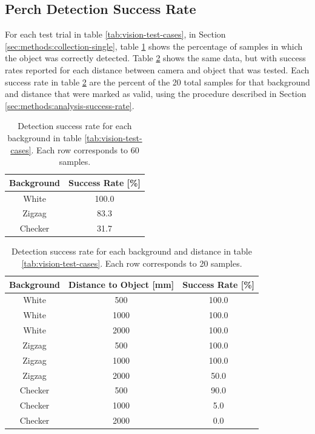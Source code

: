 \subsection{Perch Detection Success Rate} \label{sec:results:perch-rate}

For each test trial in table \ref{tab:vision-test-cases}, in Section \ref{sec:methods:collection-single}, table \ref{tab:success-rates} shows
the percentage of samples in which the object was correctly detected. Table \ref{tab:success-rates-dist}
shows the same data, but with success rates reported for each distance between camera and object that 
was tested. Each success rate in table \ref{tab:success-rates-dist} are the percent of the 20 total
samples for that background and distance that were marked as valid, using the procedure described in 
Section \ref{sec:methods:analysis-success-rate}.

\begin{table}[H]
    \centering
    \caption{Detection success rate for each background in table \ref{tab:vision-test-cases}. Each row corresponds to 60 samples.}
    \label{tab:success-rates}
    \begin{tabular}{|c||c|}
        \hline
        Background & Success Rate [\%] \\
        \hline
        White & 100.0  \\
        Zigzag & 83.3 \\
        Checker & 31.7 \\
        \hline
    \end{tabular}
\end{table}

\begin{table}[H]
    \centering
    \caption{Detection success rate for each background and distance in table \ref{tab:vision-test-cases}. Each row corresponds to 20 samples.}
    \label{tab:success-rates-dist}
    \begin{tabular}{|c|c||c|}
        \hline
        Background & Distance to Object [mm] & Success Rate [\%] \\
        \hline
        White & 500 & 100.0 \\
        White & 1000 & 100.0 \\
        White & 2000 & 100.0 \\
        Zigzag & 500 & 100.0 \\
        Zigzag & 1000 & 100.0 \\
        Zigzag & 2000 & 50.0 \\
        Checker & 500 & 90.0 \\
        Checker & 1000 & 5.0 \\
        Checker & 2000 & 0.0 \\
        \hline
    \end{tabular}
\end{table}

